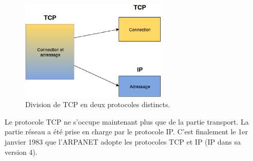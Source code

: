\begin{figure}[h]
\centering
\includegraphics[width=7cm]{./pics/tcp2ip.eps}
\caption{Division de TCP en deux protocoles distincts.}
\label{fig:tcp2ip}
\end{figure}

Le protocole TCP ne s'occupe maintenant plus que de la partie transport. La
partie réseau a été prise en charge par le protocole IP.  C'est finalement le
1er janvier 1983 que l'ARPANET adopte les protocoles TCP et IP (IP dans sa version 4). 

